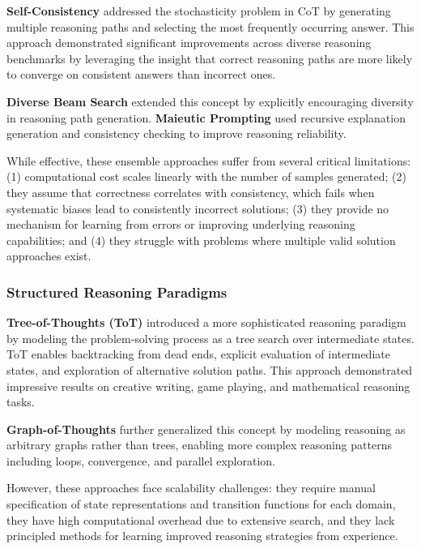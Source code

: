 \documentclass[10pt,twocolumn]{article}
\begin{document}
\textbf{Self-Consistency} \cite{wang2022self} addressed the stochasticity problem in CoT by generating multiple reasoning paths and selecting the most frequently occurring answer. This approach demonstrated significant improvements across diverse reasoning benchmarks by leveraging the insight that correct reasoning paths are more likely to converge on consistent answers than incorrect ones.

\textbf{Diverse Beam Search} \cite{li2022advance} extended this concept by explicitly encouraging diversity in reasoning path generation. \textbf{Maieutic Prompting} \cite{jung2022maieutic} used recursive explanation generation and consistency checking to improve reasoning reliability.

While effective, these ensemble approaches suffer from several critical limitations: (1) computational cost scales linearly with the number of samples generated; (2) they assume that correctness correlates with consistency, which fails when systematic biases lead to consistently incorrect solutions; (3) they provide no mechanism for learning from errors or improving underlying reasoning capabilities; and (4) they struggle with problems where multiple valid solution approaches exist.

\subsubsection{Structured Reasoning Paradigms}

\textbf{Tree-of-Thoughts (ToT)} \cite{yao2023tree} introduced a more sophisticated reasoning paradigm by modeling the problem-solving process as a tree search over intermediate states. ToT enables backtracking from dead ends, explicit evaluation of intermediate states, and exploration of alternative solution paths. This approach demonstrated impressive results on creative writing, game playing, and mathematical reasoning tasks.

\textbf{Graph-of-Thoughts} \cite{besta2023graph} further generalized this concept by modeling reasoning as arbitrary graphs rather than trees, enabling more complex reasoning patterns including loops, convergence, and parallel exploration.

However, these approaches face scalability challenges: they require manual specification of state representations and transition functions for each domain, they have high computational overhead due to extensive search, and they lack principled methods for learning improved reasoning strategies from experience.
\end{document}
